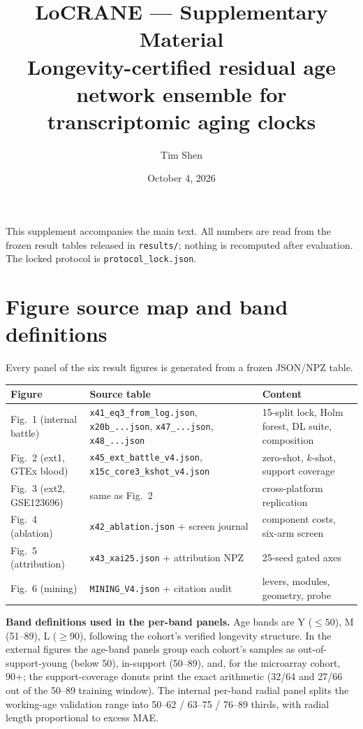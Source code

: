 \documentclass[11pt]{article}
\title{\textbf{LoCRANE --- Supplementary Material}\\
\large Longevity-certified residual age network ensemble for transcriptomic aging clocks}
\author{Tim Shen}
\date{October 4, 2026}
\begin{document}
\maketitle
\noindent This supplement accompanies the main text. All numbers are read from the
frozen result tables released in \texttt{results/}; nothing is recomputed after
evaluation. The locked protocol is \texttt{protocol\_lock.json}.

\section{Figure source map and band definitions}
Every panel of the six result figures is generated from a frozen JSON/NPZ table.
\begin{table}[h]
\centering\small
\begin{tabular}{lll}
\toprule
Figure & Source table & Content \\
\midrule
Fig.~1 (internal battle) & \texttt{x41\_eq3\_from\_log.json}, \texttt{x20b\_...json}, \texttt{x47\_...json}, \texttt{x48\_...json} & 15-split lock, Holm forest, DL suite, composition \\
Fig.~2 (ext1, GTEx blood) & \texttt{x45\_ext\_battle\_v4.json}, \texttt{x15c\_core3\_kshot\_v4.json} & zero-shot, $k$-shot, support coverage \\
Fig.~3 (ext2, GSE123696) & same as Fig.~2 & cross-platform replication \\
Fig.~4 (ablation) & \texttt{x42\_ablation.json} + screen journal & component costs, six-arm screen \\
Fig.~5 (attribution) & \texttt{x43\_xai25.json} + attribution NPZ & 25-seed gated axes \\
Fig.~6 (mining) & \texttt{MINING\_V4.json} + citation audit & levers, modules, geometry, probe \\
\bottomrule
\end{tabular}
\end{table}

\textbf{Band definitions used in the per-band panels.} Age bands are
Y ($\le 50$), M (51--89), L ($\ge 90$), following the cohort's verified
longevity structure. In the external figures the age-band panels group each
cohort's samples as out-of-support-young (below 50), in-support (50--89), and,
for the microarray cohort, 90+; the support-coverage donuts print the exact
arithmetic (32/64 and 27/66 out of the 50--89 training window). The internal
per-band radial panel splits the working-age validation range into
50--62 / 63--75 / 76--89 thirds, with radial length proportional to excess MAE.
\end{document}

